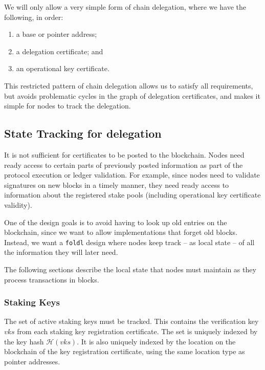 \documentclass[11pt,a4paper]{article}
\begin{document}
We will only allow a very simple form of chain delegation, where we have
the following, in order:

\begin{enumerate}
\item
  a base or pointer address;
\item
  a delegation certificate; and
\item
  an operational key certificate.
\end{enumerate}

This restricted pattern of chain delegation allows us to satisfy all
requirements, but avoids problematic cycles in the graph of delegation
certificates, and makes it simple for nodes to track the delegation.

\subsection{State Tracking for delegation}
\label{state-tracking-for-delegation}

It is not sufficient for certificates to be posted to the blockchain.
Nodes need ready access to certain parts of previously posted
information as part of the protocol execution or ledger validation. For
example, since nodes need to validate signatures on new blocks in a
timely manner, they need ready access to information about the registered
stake pools (including operational key certificate validity).

One of the design goals is to avoid having to look up old entries on the
blockchain, since we want to allow implementations that forget old
blocks. Instead, we want a {\tt foldl} design where nodes keep track -- as
local state -- of all the information they will later need.

The following sections describe the local state that nodes must maintain
as they process transactions in blocks.

\subsubsection{Staking Keys}
\label{stake-keys}

The set of active staking keys must be tracked. This contains the
verification key \(vks\) from each staking key registration certificate.
The set is uniquely indexed by the key hash \(\mathcal{H}(vks)\). It is
also uniquely indexed by the location on the blockchain of the key
registration certificate, using the same location type as pointer
addresses.
\end{document}
